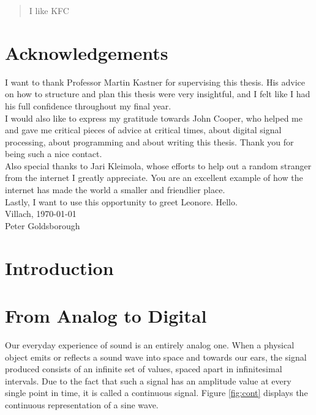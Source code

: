 \documentclass[12pt,twoside]{report}
\begin{document}
\begin{abstract}
  I like KFC
\end{abstract}

\chapter*{Acknowledgements}

I want to thank Professor Martin Kastner for supervising this thesis. His advice on how to structure and plan this thesis were very insightful, and I felt like I had his full confidence throughout my final year.\\

\noindent I would also like to express my gratitude towards John Cooper, who helped me and gave me critical pieces of advice at critical times, about digital signal processing, about programming and about writing this thesis. Thank you for being such a nice contact.\\

\noindent Also special thanks to Jari Kleimola, whose efforts to help out a random stranger from the internet I greatly appreciate. You are an excellent example of how the internet has made the world a smaller and friendlier place. \\

\noindent Lastly, I want to use this opportunity to greet Leonore. Hello. \\

\noindent Villach, \today \\

\noindent Peter Goldsborough

\tableofcontents

\chapter{Introduction}

\lipsum[1]

\chapter{From Analog to Digital}

Our everyday experience of sound is an entirely analog one. When a physical     object emits or reflects a sound wave into space and towards our ears, the signal produced consists of an infinite set of values, spaced apart in infinitesimal intervals. Due to the fact that such a signal has an amplitude value at every single point in time, it is called a continuous signal.  Figure \ref{fig:cont} displays the continuous representation of a sine wave.
\end{document}
